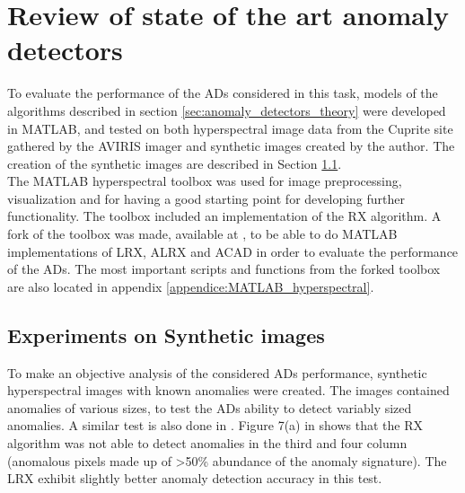 
\chapter{Review of state of the art anomaly detectors}
\label{chapter:review_anomaly_detectors}
To evaluate the performance of the ADs considered in this task, models of the algorithms described in section \ref{sec:anomaly_detectors_theory} were developed in MATLAB, and tested on both hyperspectral image data from the Cuprite site \cite{Cuprite_data} gathered by the AVIRIS imager and synthetic images created by the author. The creation of the synthetic images are described in Section \ref{sec:synthetic_images}.
\\

The MATLAB hyperspectral toolbox \cite{MATLAB_hyperspectral_toolbox} was used for image preprocessing, visualization and for having a good starting point for developing further functionality. The toolbox included an implementation of the RX algorithm. A fork of the toolbox was made, available at \cite{MATLAB_hyperspectral_toolbox_fork}, to be able to do MATLAB implementations of LRX, ALRX and ACAD in order to evaluate the performance of the ADs. The most important scripts and functions from the forked toolbox are also located in appendix \ref{appendice:MATLAB_hyperspectral}.

\section{Experiments on Synthetic images}
\label{sec:synthetic_images}
To make an objective analysis  of the considered ADs performance, synthetic hyperspectral images with known anomalies were created. The images contained anomalies of various sizes, to test the ADs ability to detect variably sized anomalies. A similar test is also done in \cite{global_and_local_rx}. Figure 7(a) in \cite{global_and_local_rx} shows that the RX algorithm was not able to detect anomalies in the third and four column (anomalous pixels made up of >50\% abundance of the anomaly signature). The LRX exhibit slightly better anomaly detection accuracy in this test.
\\

